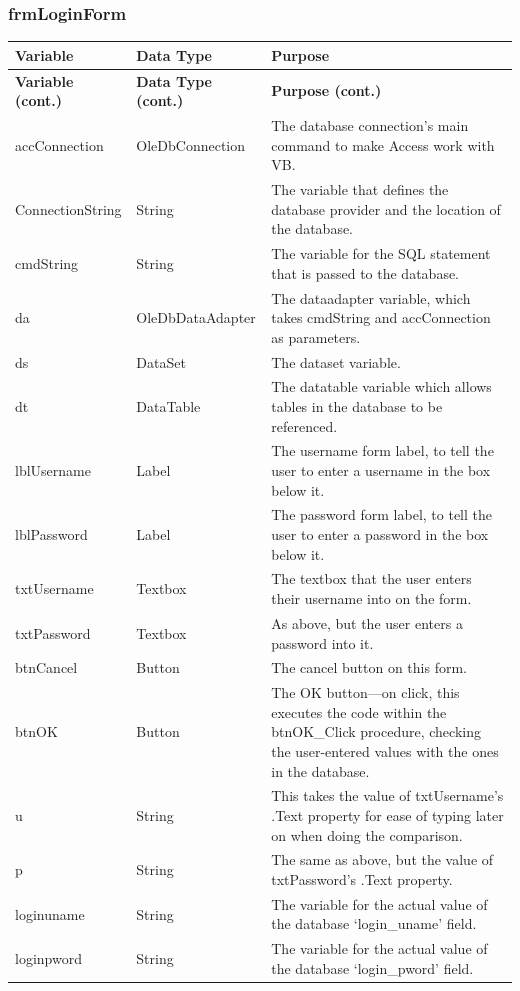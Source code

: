	\subsubsection{frmLoginForm}
	\begin{longtable}{ | p{4cm} | p{3cm} | p{10cm} | }
		\hline
		\textbf{Variable} & \textbf{Data Type} & \textbf{Purpose}\\
		\endfirsthead
		\hline
		\textbf{Variable (cont.)} & \textbf{Data Type (cont.)} & \textbf{Purpose (cont.)}\\
		\endhead
		\hline
		accConnection & OleDbConnection & The database connection's main command to make Access work with VB.\\
		\hline
		ConnectionString & String & The variable that defines the database provider and the location of the database.\\
		\hline
		cmdString & String & The variable for the SQL statement that is passed to the database.\\
		\hline
		da & OleDbDataAdapter & The dataadapter variable, which takes cmdString and accConnection as parameters.\\
		\hline
		ds & DataSet & The dataset variable.\\
		\hline
		dt & DataTable & The datatable variable which allows tables in the database to be referenced.\\
		\hline
		lblUsername & Label & The username form label, to tell the user to enter a username in the box below it.\\
		\hline
		lblPassword & Label & The password form label, to tell the user to enter a password in the box below it.\\
		\hline
		txtUsername & Textbox & The textbox that the user enters their username into on the form.\\
		\hline
		txtPassword & Textbox & As above, but the user enters a password into it.\\
		\hline
		btnCancel & Button & The cancel button on this form.\\
		\hline
		btnOK & Button & The OK button---on click, this executes the code within the btnOK\_Click procedure, checking the user-entered values with the ones in the database.\\
		\hline
		u & String & This takes the value of txtUsername's .Text property for ease of typing later on when doing the comparison.\\
		\hline
		p & String & The same as above, but the value of txtPassword's .Text property.\\
		\hline
		loginuname & String & The variable for the actual value of the database `login\_uname' field.\\
		\hline
		loginpword & String & The variable for the actual value of the database `login\_pword' field.\\
		\hline
	\end{longtable}
	
